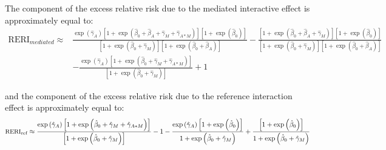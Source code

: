 \documentclass[
]{book}
\begin{document}
The component of the excess relative risk due to the mediated interactive effect is approximately equal to:
\[
\begin{array}{rl}
\text{RERI}_{mediated} \approx & \frac{\exp \left( \hat{\gamma}_A \right) \left[1 + \exp \left(\hat{\beta}_0 + \hat{\beta}_A + \hat{\gamma}_M + \hat{\gamma}_{A \ast M} \right) \right] \left[1 + \exp \left(\hat{\beta}_0 \right) \right]}{\left[ 1 + \exp \left(\hat{\beta}_0 + \hat{\gamma}_M \right)\right] \left[ 1 + \exp \left(\hat{\beta}_0 + \hat{\beta}_A  \right) \right]}  - \frac{\left[1 + \exp \left(\hat{\beta}_0 + \hat{\beta}_A + \hat{\gamma}_M \right) \right] \left[1 + \exp \left(\hat{\beta}_0 \right) \right]}{\left[ 1 + \exp \left(\hat{\beta}_0 + \hat{\gamma}_M \right)\right] \left[ 1 + \exp \left(\hat{\beta}_0 + \hat{\beta}_A \right) \right]} \\
 & - \frac{\exp \left( \hat{\gamma}_A \right) \left[1 + \exp \left(\hat{\beta}_0 + \hat{\gamma}_M + \hat{\gamma}_{A \ast M} \right) \right]}{\left[ 1 + \exp \left(\hat{\beta}_0 + \hat{\gamma}_M \right)\right]} + 1
\end{array}
\]

and the component of the excess relative risk due to the reference interaction effect is approximately equal to:
\[\small
\text{RERI}_\text{ref} \approx \frac{\exp \left( \hat{\gamma}_A\right) \left[1 + \exp \left(\hat{\beta}_0 + \hat{\gamma}_M + \hat{\gamma}_{A \ast M} \right) \right]}{\left[ 1 + \exp \left(\hat{\beta}_0 + \hat{\gamma}_M \right)\right] } - 1  - \frac{\exp \left( \hat{\gamma}_A \right) \left[1 + \exp \left(\hat{\beta}_0 \right) \right]}{ 1 + \exp \left(\hat{\beta}_0 + \hat{\gamma}_M \right)} + \frac{ \left[1 + \exp \left(\hat{\beta}_0 \right) \right]}{ 1 + \exp \left(\hat{\beta}_0 + \hat{\gamma}_M \right) } 
\]
\end{document}
